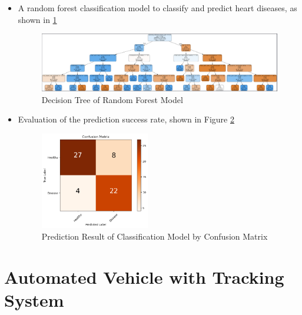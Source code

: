 \documentclass[12pt]{article}
\begin{document}
\begin{itemize}

    \item{A random forest classification model to classify and predict heart diseases, as shown in \ref*{Random Forest Model}}
    
    \begin{figure}[H]
        \centering
        \includegraphics[width=1.0\textwidth]{portfolio/Decision_Tree.png}
        \caption{Decision Tree of Random Forest Model}
        \label{Random Forest Model}
    \end{figure}

    \item {Evaluation of the prediction success rate, shown in Figure \ref*{Model-Evaluation}}
    \begin{figure}[H]
        \centering
        \includegraphics[width=0.45\textwidth]{portfolio/Confusion_Matrix.png}
        \caption{Prediction Result of Classification Model by Confusion Matrix}
        \label{Model-Evaluation}
    \end{figure}
    
\end{itemize}

\newpage

\section{Automated Vehicle with Tracking System}
\end{document}
